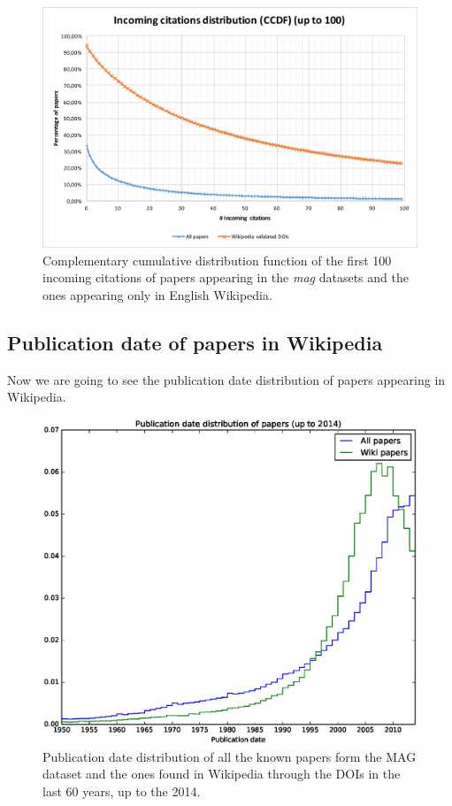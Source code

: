 \begin{figure}[h]
\centering
\includegraphics[keepaspectratio=true, width=\textwidth]{assets/incoming_cits_ccdf_100}
\caption{Complementary cumulative distribution function of the first 100 incoming citations of papers appearing in the \emph{mag} datasets and the ones appearing only in English Wikipedia.}
\label{fig:incoming_citations_ccdf_100}
\end{figure}

\subsection{Publication date of papers in Wikipedia}
Now we are going to see the publication date distribution of papers appearing in Wikipedia.

\begin{figure}[h]
\centering
\includegraphics[keepaspectratio=true, width=\textwidth]{assets/publication_date_pdf}
\caption{Publication date distribution of all the known papers form the MAG dataset and the ones found in Wikipedia through the DOIs in the last 60 years, up to the 2014.
}
\label{fig:publication_date_pdf}
\end{figure}

